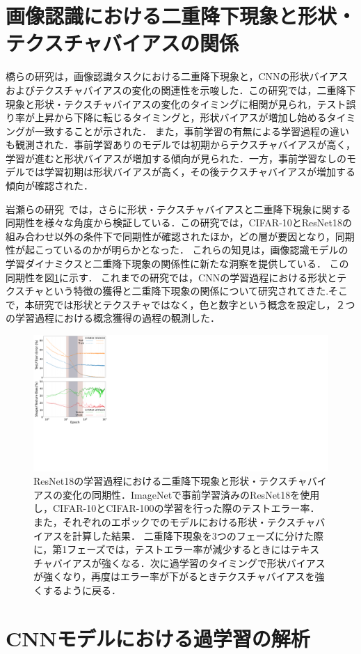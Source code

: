 \newpage

\section{画像認識における二重降下現象と形状・テクスチャバイアスの関係}

橋らの研究\cite{DD_STB}は，画像認識タスクにおける二重降下現象と，CNNの形状バイアスおよびテクスチャバイアスの変化の関連性を示唆した．この研究では，二重降下現象と形状・テクスチャバイアスの変化のタイミングに相関が見られ，テスト誤り率が上昇から下降に転じるタイミングと，形状バイアスが増加し始めるタイミングが一致することが示された．
また，事前学習の有無による学習過程の違いも観測された．事前学習ありのモデルでは初期からテクスチャバイアスが高く，学習が進むと形状バイアスが増加する傾向が見られた．一方，事前学習なしのモデルでは学習初期は形状バイアスが高く，その後テクスチャバイアスが増加する傾向が確認された．

岩瀬らの研究~\cite{icpr2024iwase}では，さらに形状・テクスチャバイアスと二重降下現象に関する同期性を様々な角度から検証している．この研究では，CIFAR-10とResNet18の組み合わせ以外の条件下で同期性が確認されたほか，どの層が要因となり，同期性が起こっているのかが明らかとなった．
これらの知見は，画像認識モデルの学習ダイナミクスと二重降下現象の関係性に新たな洞察を提供している．
この同期性を図\ref{fig:iwaseICPR}に示す．
これまでの研究では，CNNの学習過程における形状とテクスチャという特徴の獲得と二重降下現象の関係について研究されてきた.そこで，本研究では形状とテクスチャではなく，色と数字という概念を設定し，２つの学習過程における概念獲得の過程の観測した．

\begin{figure}[tb]
    \centering
    \includegraphics[width=\linewidth]{fig/iwaseICPR.pdf}
    \caption[ResNet18の学習過程における二重降下現象と形状・テクスチャバイアスの変化の同期性．]{ResNet18の学習過程における二重降下現象と形状・テクスチャバイアスの変化の同期性．ImageNetで事前学習済みのResNet18を使用し，CIFAR-10とCIFAR-100の学習を行った際のテストエラー率．また，それぞれのエポックでのモデルにおける形状・テクスチャバイアスを計算した結果．
    二重降下現象を3つのフェーズに分けた際に，第1フェーズでは，テストエラー率が減少するときにはテキスチャバイアスが強くなる．次に過学習のタイミングで形状バイアスが強くなり，再度はエラー率が下がるときテクスチャバイアスを強くするように戻る．}
    \label{fig:iwaseICPR}
\end{figure}

\section{CNNモデルにおける過学習の解析}
